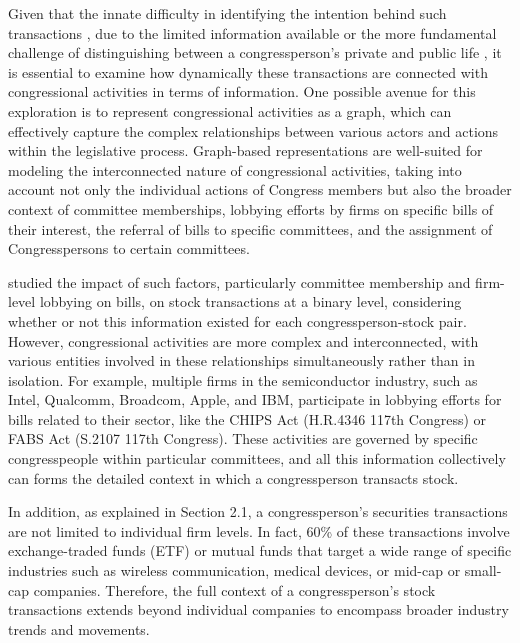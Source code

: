 \documentclass[15pt,letterpaper]{article}
\begin{document}
Given that the innate difficulty in identifying the intention behind such transactions \citep{zi11,zi24, eg13, eg14}, due to the limited information available or the more fundamental challenge of distinguishing between a congressperson's private and public life \citep{buchanan1984}, it is essential to examine how dynamically these transactions are connected with congressional activities in terms of information. 
One possible avenue for this exploration is to represent congressional activities as a graph, which can effectively capture the complex relationships between various actors and actions \citep{g1, g2} within the legislative process. Graph-based representations are well-suited for modeling the interconnected nature of congressional activities, taking into account not only the individual actions of Congress members but also the broader context of committee memberships, lobbying efforts by firms on specific bills of their interest, the referral of bills to specific committees, and the assignment of Congresspersons to certain committees.

\cite{eg14} studied the impact of such factors, particularly committee membership and firm-level lobbying on bills,  on stock transactions at a binary level, considering whether or not this information existed for each congressperson-stock pair. However, congressional activities are more complex and interconnected, with various entities involved in these relationships simultaneously rather than in isolation. For example, multiple firms in the semiconductor industry, such as Intel, Qualcomm, Broadcom, Apple, and IBM, participate in lobbying efforts for bills related to their sector, like the CHIPS Act (H.R.4346 117th Congress) or FABS Act (S.2107 117th Congress). These activities are governed by specific congresspeople within particular committees, and all this information collectively can forms the detailed context in which a congressperson transacts stock.

In addition, as explained in Section 2.1, a congressperson's securities transactions are not limited to individual firm levels. In fact, 60\% of these transactions involve exchange-traded funds (ETF) or mutual funds that target a wide range of specific industries such as wireless communication, medical devices, or mid-cap or small-cap companies. Therefore, the full context of a congressperson's stock transactions extends beyond individual companies to encompass broader industry trends and movements.
\end{document}
